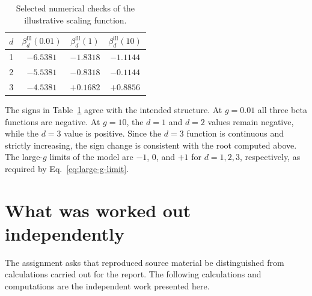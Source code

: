 \documentclass[11pt,a4paper]{article}
\numberwithin{equation}{section}
\begin{document}
\begin{table}[H]
\centering
\caption{Selected numerical checks of the illustrative scaling function.}
\label{tab:numerical-checks}
\begin{tabular}{cccc}
\toprule
$d$ & $\beta_d^{\mathrm{ill}}(0.01)$ & $\beta_d^{\mathrm{ill}}(1)$ & $\beta_d^{\mathrm{ill}}(10)$\\
\midrule
1 & $-6.5381$ & $-1.8318$ & $-1.1144$\\
2 & $-5.5381$ & $-0.8318$ & $-0.1144$\\
3 & $-4.5381$ & $+0.1682$ & $+0.8856$\\
\bottomrule
\end{tabular}
\end{table}

The signs in Table~\ref{tab:numerical-checks} agree with the intended structure. At $g=0.01$ all three beta functions are negative. At $g=10$, the $d=1$ and $d=2$ values remain negative, while the $d=3$ value is positive. Since the $d=3$ function is continuous and strictly increasing, the sign change is consistent with the root computed above. The large-$g$ limits of the model are $-1$, $0$, and $+1$ for $d=1,2,3$, respectively, as required by Eq.~\eqref{eq:large-g-limit}.

\section{What was worked out independently}

The assignment asks that reproduced source material be distinguished from calculations carried out for the report. The following calculations and computations are the independent work presented here.
\end{document}
